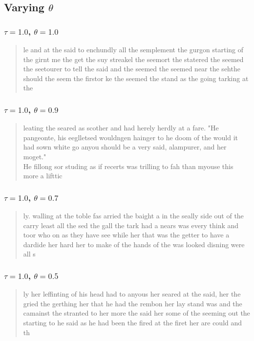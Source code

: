 \documentclass{article}
\begin{document}
\subsection*{Varying $\theta$}
\subsubsection*{$\tau=1.0$, $\theta=1.0$}
	\begin{quote}
		le and at the said to enchundly all the semplement the gurgon starting of the girnt me the get the suy streakel the seemort the statered the seemed the seetourer to tell the said and the seemed the seemed  near the sehthe should the seem the firstor ke the seemed the stand as the going tarking at the
	\end{quote}

\subsubsection*{$\tau=1.0$, $\theta=0.9$}
	\begin{quote}
		leating the seared as scother and had herely herdly at a fare.  "He pangeonte, his eeglletsed wouldngen hainger to he doom of the would it had sown white go anyou should be a very said, alampurer, and her moget."\\He fillong sor studing as if recerts was trilling to fah than myouse this more a lifttic
	\end{quote}

\subsubsection*{$\tau=1.0$, $\theta=0.7$}
	\begin{quote}
		ly.  walling at the toble fas arried the baight a in the seally side out of the carry least all the sed the gall the tark had a nears was every think and toor who on as they have see while her that was the getter to have a dardide her hard her to make of the hands of the was looked disning were all s
	\end{quote}

\subsubsection*{$\tau=1.0$, $\theta=0.5$}
	\begin{quote}
		ly her leffinting of his head had to anyous her seared at the said, her the gried the gerthing her that he had the rembon her lay stand was and the camainst the stranted to her more the said her some of the seeming out the starting to he said as he had been the fired at the firet her are could and th
	\end{quote}
\end{document}
